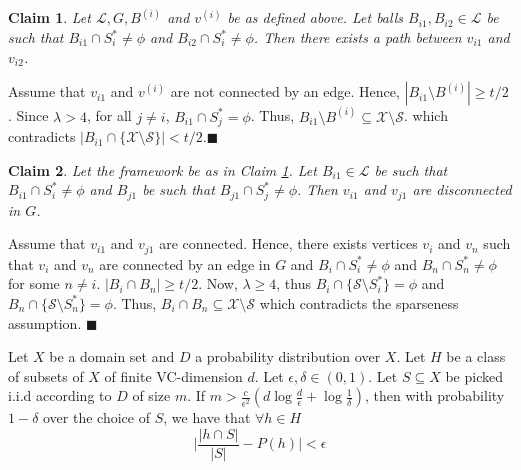 \documentclass[orivec]{llncs}
\newtheorem{smallLemma}{Claim}
\newcommand{\mc}{\mathcal}
\renewcommand{\qed}{\hfill\ensuremath{\blacksquare}}
\begin{document}
\begin{smallLemma}
\label{claim:lambda1}
Let $\mc L, G, B^{(i)}$ and $v^{(i)}$ be as defined above. Let balls $B_{i1}, B_{i2} \in \mc L$ be such that $B_{i1} \cap S_i^* \neq \phi$ and $B_{i2} \cap S_i^* \neq \phi$. Then there exists a path between $v_{i1}$ and $v_{i2}$.
\end{smallLemma}
\vspace{-0.1in} Assume that $v_{i1}$ and $v^{(i)}$ are not connected by an edge. Hence, $|B_{i1} \setminus B^{(i)}| \ge t/2$. Since $\lambda > 4$, for all $j \neq i$, $B_{i1} \cap S_j^* = \phi$. Thus, $B_{i1} \setminus B^{(i)} \subseteq \mc X \setminus \mc S$. which contradicts $|B_{i1} \cap \{\mc X \setminus \mc S\}| < t/2$.\qed

\begin{smallLemma}
Let the framework be as in Claim \ref{claim:lambda1}. Let $B_{i1} \in \mc L$ be such that $B_{i1} \cap S_i^* \neq \phi$ and $B_{j1}$ be such that $B_{j1} \cap S_j^* \neq \phi$. Then $v_{i1}$ and $v_{j1}$ are disconnected in $G$.
\end{smallLemma}
\vspace{-0.1in} Assume that $v_{i1}$ and $v_{j1}$ are connected. Hence, there exists vertices $v_{i}$ and $v_{n}$ such that $v_i$ and $v_n$ are connected by an edge in $G$ and $B_i \cap S_i^* \neq \phi$ and $B_n \cap S_n^* \neq \phi$ for some $n \neq i$. $|B_i \cap B_n| \ge t/2$. Now, $\lambda \ge 4$, thus $B_i \cap \{\mc S \setminus S_i^*\} = \phi$ and $B_n \cap \{\mc S\setminus S_n^*\} = \phi$. Thus, $B_i \cap B_n \subseteq \mc X \setminus \mc S$ which contradicts the sparseness assumption.
\qed

\label{appendix:sectiontr}
\begin{theorem}\label{theorem:vceapprox}
Let $X$ be a domain set and $D$ a probability distribution over $X$. Let $H$ be a class of subsets of $X$ of finite VC-dimension $d$. Let $\epsilon, \delta \in (0,1)$. Let $S \subseteq X$ be picked i.i.d according to $D$ of size $m$. If $m > \frac{c}{\epsilon^2}(d\log \frac{d}{\epsilon}+\log\frac{1}{\delta})$, then  with probability $1-\delta$ over the choice of $S$, we have that $\forall h \in H$
$$\bigg|\frac{|h\cap S|}{|S|} - P(h)\bigg| < \epsilon$$
\end{theorem}
\end{document}
